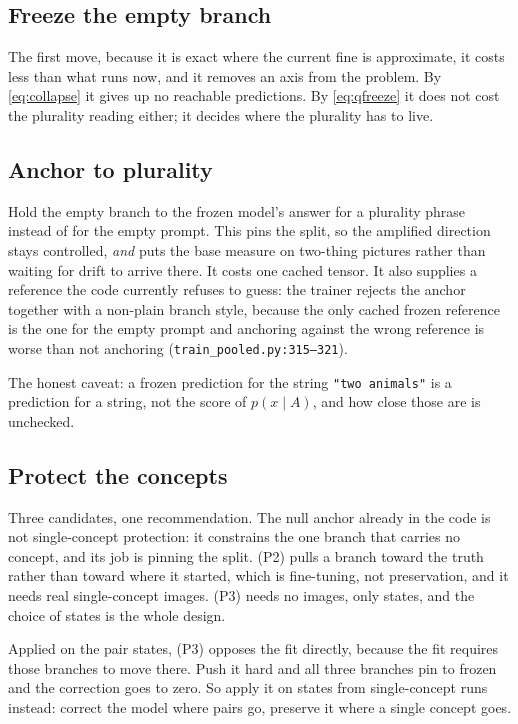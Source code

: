 \documentclass[11pt]{article}
\begin{document}
\subsection*{Freeze the empty branch}
The first move, because it is exact where the current fine is approximate, it costs less than what
runs now, and it removes an axis from the problem. By \eqref{eq:collapse} it gives up no reachable
predictions. By \eqref{eq:qfreeze} it does not cost the plurality reading either; it decides where
the plurality has to live.

\subsection*{Anchor to plurality}
Hold the empty branch to the frozen model's answer for a plurality phrase instead of for the empty
prompt. This pins the split, so the amplified direction stays controlled, \emph{and} puts the base
measure on two-thing pictures rather than waiting for drift to arrive there. It costs one cached
tensor. It also supplies a reference the code currently refuses to guess: the trainer rejects the
anchor together with a non-plain branch style, because the only cached frozen reference is the one
for the empty prompt and anchoring against the wrong reference is worse than not anchoring
(\texttt{train\_pooled.py:315--321}).

The honest caveat: a frozen prediction for the string \texttt{"two animals"} is a prediction for a
string, not the score of $p(x \mid A)$, and how close those are is unchecked.

\subsection*{Protect the concepts}
Three candidates, one recommendation. The null anchor already in the code is not single-concept
protection: it constrains the one branch that carries no concept, and its job is pinning the split.
(P2) pulls a branch toward the truth rather than toward where it started, which is fine-tuning, not
preservation, and it needs real single-concept images. (P3) needs no images, only states, and the
choice of states is the whole design.

Applied on the pair states, (P3) opposes the fit directly, because the fit requires those branches
to move there. Push it hard and all three branches pin to frozen and the correction goes to zero.
So apply it on states from single-concept runs instead: correct the model where pairs go, preserve
it where a single concept goes.
\end{document}
